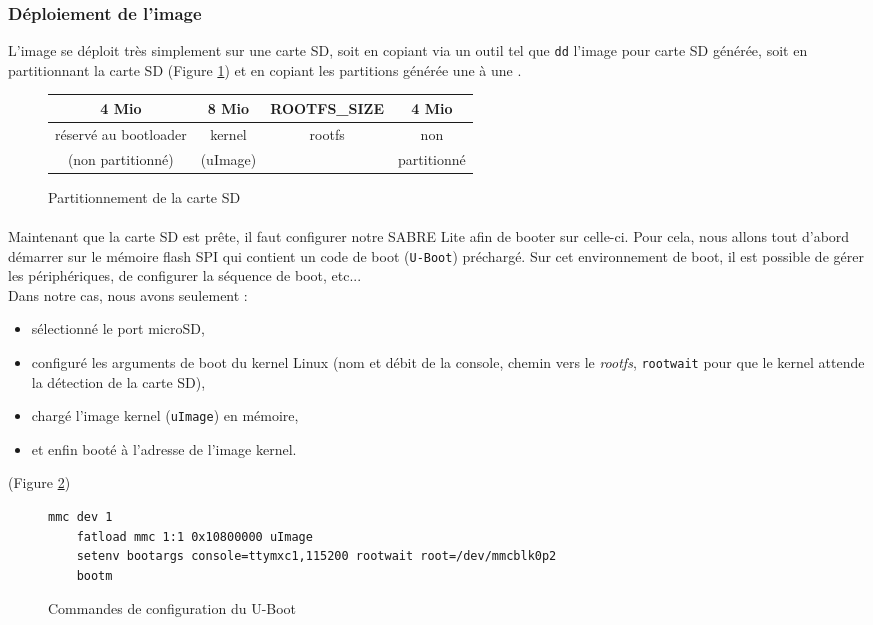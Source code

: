 \subsubsection{Déploiement de l'image}
L'image se déploit très simplement sur une carte SD, soit en copiant via un
outil tel que \texttt{dd} l'image pour carte SD générée, soit en partitionnant
la carte SD (Figure \ref{partSD}) et en copiant les partitions générée une à une
\cite{angolini_yocto_2014}.

\begin{figure}
  \centering
  \begin{tabular}{|c|c|c|c|}
    4 Mio & 8 Mio & ROOTFS\_SIZE & 4 Mio \\
    \hline
    réservé au bootloader & kernel & rootfs & non \\
    (non partitionné) & (uImage) & & partitionné \\
  \end{tabular}
  \caption{Partitionnement de la carte SD}
  \label{partSD}
\end{figure}

\paragraph{} Maintenant que la carte SD est prête, il faut configurer notre
SABRE Lite afin de booter sur celle-ci. Pour cela, nous allons tout d'abord
démarrer sur le mémoire flash SPI qui contient un code de boot
(\texttt{U-Boot}\cite{denk_denx_2015}) préchargé. Sur cet environnement de
boot, il est possible de gérer les périphériques, de configurer la séquence de
boot, etc... \\
Dans notre cas, nous avons seulement :
\begin{itemize}
\renewcommand{\labelitemi}{$\bullet$}
\item sélectionné le port microSD, 
\item configuré les arguments de boot du kernel Linux (nom et débit de la console,
  chemin vers le \textit{rootfs}, \texttt{rootwait} pour que le kernel attende
  la détection de la carte SD),
\item chargé l'image kernel (\texttt{uImage}) en mémoire,
\item et enfin booté à l'adresse de l'image kernel.
\end{itemize}
(Figure \ref{ubootcmds})

\begin{figure}[H]
  \centering
  \begin{lstlisting}[language=bash, frame=single, basicstyle=\scriptsize]
    mmc dev 1
    fatload mmc 1:1 0x10800000 uImage
    setenv bootargs console=ttymxc1,115200 rootwait root=/dev/mmcblk0p2
    bootm
  \end{lstlisting}
  \caption{Commandes de configuration du U-Boot}
  \label{ubootcmds}
\end{figure}

